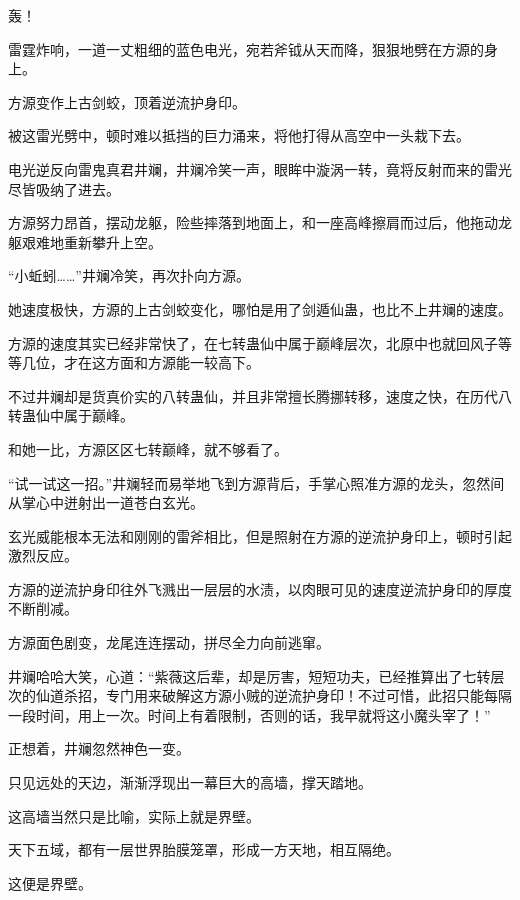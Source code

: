 
\begin{this_body}



轰！

雷霆炸响，一道一丈粗细的蓝色电光，宛若斧钺从天而降，狠狠地劈在方源的身上。

方源变作上古剑蛟，顶着逆流护身印。

被这雷光劈中，顿时难以抵挡的巨力涌来，将他打得从高空中一头栽下去。

电光逆反向雷鬼真君井斓，井斓冷笑一声，眼眸中漩涡一转，竟将反射而来的雷光尽皆吸纳了进去。

方源努力昂首，摆动龙躯，险些摔落到地面上，和一座高峰擦肩而过后，他拖动龙躯艰难地重新攀升上空。

“小蚯蚓……”井斓冷笑，再次扑向方源。

她速度极快，方源的上古剑蛟变化，哪怕是用了剑遁仙蛊，也比不上井斓的速度。

方源的速度其实已经非常快了，在七转蛊仙中属于巅峰层次，北原中也就回风子等等几位，才在这方面和方源能一较高下。

不过井斓却是货真价实的八转蛊仙，并且非常擅长腾挪转移，速度之快，在历代八转蛊仙中属于巅峰。

和她一比，方源区区七转巅峰，就不够看了。

“试一试这一招。”井斓轻而易举地飞到方源背后，手掌心照准方源的龙头，忽然间从掌心中迸射出一道苍白玄光。

玄光威能根本无法和刚刚的雷斧相比，但是照射在方源的逆流护身印上，顿时引起激烈反应。

方源的逆流护身印往外飞溅出一层层的水渍，以肉眼可见的速度逆流护身印的厚度不断削减。

方源面色剧变，龙尾连连摆动，拼尽全力向前逃窜。

井斓哈哈大笑，心道：“紫薇这后辈，却是厉害，短短功夫，已经推算出了七转层次的仙道杀招，专门用来破解这方源小贼的逆流护身印！不过可惜，此招只能每隔一段时间，用上一次。时间上有着限制，否则的话，我早就将这小魔头宰了！”

正想着，井斓忽然神色一变。

只见远处的天边，渐渐浮现出一幕巨大的高墙，撑天踏地。

这高墙当然只是比喻，实际上就是界壁。

天下五域，都有一层世界胎膜笼罩，形成一方天地，相互隔绝。

这便是界壁。


\end{this_body}
